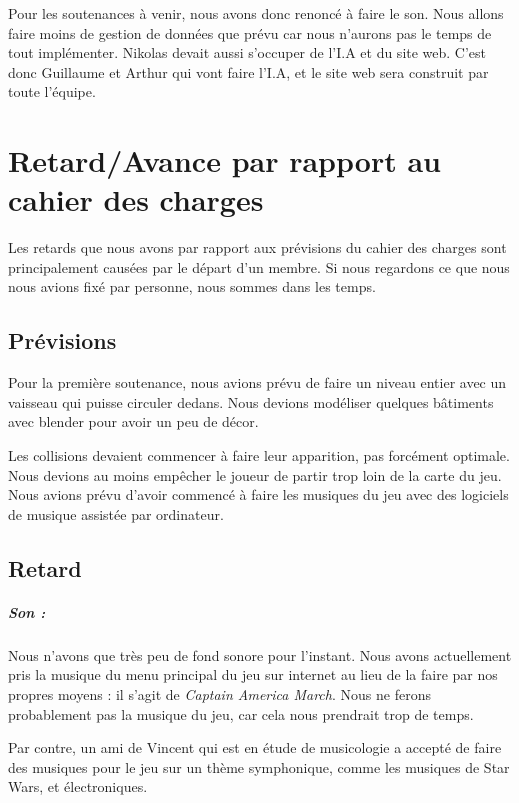 \documentclass[10pt, titlepage]{report}
\begin{document}
Pour les soutenances à venir, nous avons donc renoncé à faire le son. Nous allons faire moins de gestion de données que prévu car nous n'aurons pas le temps de tout implémenter. Nikolas devait aussi s'occuper de l'I.A et du site web. C'est donc Guillaume et Arthur qui vont faire l'I.A, et le site web sera construit par toute l'équipe.\\

\chapter{Retard/Avance par rapport au cahier des charges}
Les retards que nous avons par rapport aux prévisions du cahier des charges sont principalement causées par le départ d'un membre. Si nous regardons ce que nous nous avions fixé par personne, nous sommes dans les temps.

\section{Prévisions}

Pour la première soutenance, nous avions prévu de faire un niveau entier avec un vaisseau qui puisse circuler dedans. Nous devions modéliser quelques bâtiments avec blender pour avoir un peu de décor.

 Les collisions devaient commencer à faire leur apparition, pas forcément optimale. Nous devions au moins empêcher le joueur de partir trop loin de la carte du jeu.\\

 Nous avions prévu d'avoir commencé à faire les musiques du jeu avec des logiciels de musique assistée par ordinateur.

\section{Retard}

\paragraph{Son :}
Nous n'avons que très peu de fond sonore pour l'instant. Nous avons actuellement pris la musique du menu principal du jeu sur internet au lieu de la faire par nos propres moyens : il s'agit de \textit{Captain America March}. Nous ne ferons probablement pas la musique du jeu, car cela nous prendrait trop de temps.

 Par contre, un ami de Vincent qui est en étude de musicologie a accepté de faire des musiques pour le jeu sur un thème symphonique, comme les musiques de Star Wars, et électroniques.\\
\end{document}
